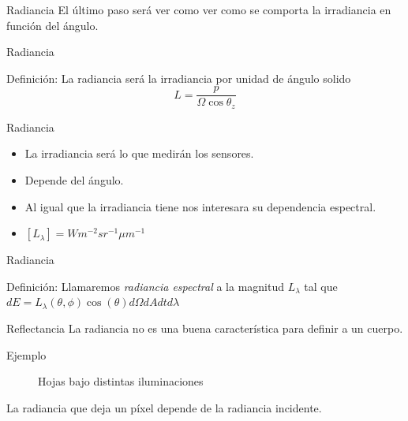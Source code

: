 \documentclass[handout,draft]{beamer}
\begin{document}
\begin{frame}{Radiancia}
  El último paso será ver como ver como se comporta la irradiancia en función del ángulo.
  \begin{figure}
  \end{figure}
\end{frame}

\begin{frame}{Radiancia}
  \begin{block}{Definición}:
    La radiancia será la irradiancia por unidad de ángulo solido
    \begin{equation}
      L = \frac{p}{\Omega \cos\theta_z}
    \end{equation}
  \end{block}
\end{frame}

\begin{frame}{Radiancia}
  \begin{itemize}[<+>]
    \item La irradiancia será lo que medirán los sensores.
    \item Depende del ángulo.
    \item Al igual que la irradiancia tiene nos interesara su dependencia espectral.
    \item $[L_\lambda] = W m^{-2} sr^{-1} \mu m^{-1}$
  \end{itemize}
\end{frame}

\begin{frame}{Radiancia}
  \begin{block}{Definición:}
    Llamaremos \emph{radiancia espectral} a la magnitud $L_\lambda$ tal que
    $dE = L_{\lambda}(\theta,\phi) \cos(\theta) d\Omega dA dt d\lambda$
  \end{block}
\end{frame}

\begin{frame}{Reflectancia}
  La radiancia no es una buena característica para definir a un cuerpo.
  \begin{exampleblock}{Ejemplo}
    \begin{figure}
      \caption{Hojas bajo distintas iluminaciones}
    \end{figure}
    La radiancia que deja un píxel depende de la radiancia incidente.
  \end{exampleblock}
\end{frame}
\end{document}
